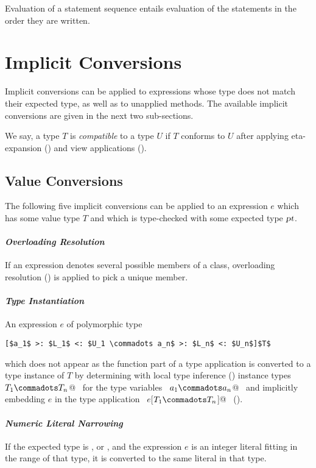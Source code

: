 Evaluation of a statement sequence entails evaluation of the
statements in the order they are written.

\section{Implicit Conversions}
\label{sec:impl-conv}

Implicit conversions can be applied to expressions whose type does not
match their expected type, as well as to unapplied methods. The
available implicit conversions are given in the next two sub-sections.

We say, a type $T$ is {\em compatible} to a type $U$ if $T$ conforms
to $U$ after applying eta-expansion () and view applications
().

\subsection{Value Conversions}

The following five implicit conversions can be applied to an
expression $e$ which has some value type $T$ and which is type-checked with
some expected type $\mbox{\sl pt}$.

\paragraph{\em Overloading Resolution} 
If an expression denotes several possible members of a class, 
overloading resolution ()
is applied to pick a unique member.

\paragraph{\em Type Instantiation}  
An expression $e$ of polymorphic type
\begin{lstlisting}
[$a_1$ >: $L_1$ <: $U_1 \commadots a_n$ >: $L_n$ <: $U_n$]$T$
\end{lstlisting}
which does not appear as the function part of
a type application is converted to a type instance of $T$
by determining with local type inference
() instance types ~\lstinline@$T_1 \commadots T_n$@~ 
for the type variables ~\lstinline@$a_1 \commadots a_n$@~ and
implicitly embedding $e$ in the type application
~\lstinline@$e$[$T_1 \commadots T_n$]@~ ().

\paragraph{\em Numeric Literal Narrowing}
If the expected type is ,  or , and
the expression $e$ is an integer literal fitting in the range of that
type, it is converted to the same literal in that type.

